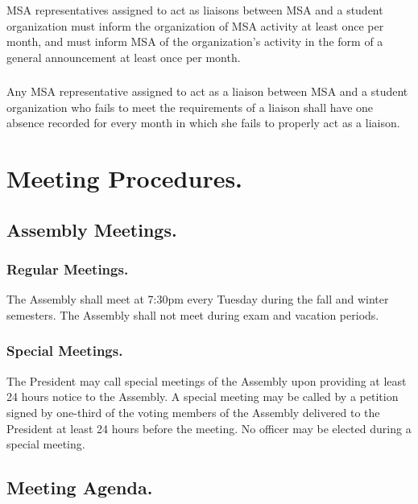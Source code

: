 \subsubsection{}
MSA representatives assigned to act as liaisons between MSA and a student organization must inform the organization of MSA activity at least once per month, and must inform MSA of the organization’s activity in the form of a general announcement at least once per month.

\subsubsection{}
Any MSA representative assigned to act as a liaison between MSA and a student organization who fails to meet the requirements of a liaison shall have one absence recorded for every month in which she fails to properly act as a liaison.


\section{Meeting Procedures.}  

\subsection{Assembly Meetings.}

\subsubsection{Regular Meetings.}  The Assembly shall meet at 7:30pm every Tuesday during the fall and winter semesters.  The Assembly shall not meet during exam and vacation periods.

\subsubsection{Special Meetings.}  The President may call special meetings of the Assembly upon providing at least 24 hours notice to the Assembly.  A special meeting may be called by a petition signed by one-third of the voting members of the Assembly delivered to the President at least 24 hours before the meeting.  No officer may be elected during a special meeting.

\subsection{Meeting Agenda.}

